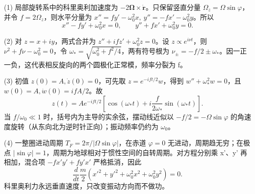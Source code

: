 (1) 局部旋转系中的科里奥利加速度为 \(-2\boldsymbol\Omega\times\dot{\boldsymbol r}\)。只保留竖直分量 \(\Omega_z=\Omega\sin\varphi\)，并令 \(f=2\Omega_z\)，则水平分量为 \(x''=f y'-\omega_0^2x,\ y''=-f x'-\omega_0^2y\)。所以
\[
x''-fy'+\omega_0^2x=0,\qquad
y''+fx'+\omega_0^2y=0.
\]

(2) 对 \(z=x+iy\)，两式合并为 \(z''+ifz'+\omega_0^2z=0\)。设 \(z\propto e^{i\nu t}\)，则 \(\nu^2+f\nu-\omega_0^2=0\)，令 \(\omega_*=\sqrt{\omega_0^2+f^2/4}\)，两有符号根为 \(\nu_\pm=-f/2\pm\omega_*\)。因一正一负，这代表相反旋向的两个圆极化正常模，频率分裂为 f。

(3) 初值 \(z(0)=A,\dot z(0)=0\)，可先取 \(z=e^{-ift/2}w\)，得到 \(w''+\omega_*^2w=0\)，且 \(w(0)=A,\dot w(0)=ifA/2\)。故
\[
z(t)=Ae^{-ift/2}\left[\cos(\omega_*t)+i\frac{f}{2\omega_*}\sin(\omega_*t)\right].
\]
当 \(f/\omega_0\ll1\) 时，括号内为主导的实余弦，摆动线近似以 \(-f/2=-\Omega\sin\varphi\) 的角速度旋转（从东向北为逆时针正向）；振动频率仍约为 \(\omega _{0}\)。

(4) 一整圈进动周期 \(T_F=2\pi/|\Omega\sin\varphi|\)，在赤道 \(\varphi=0\) 无进动，周期趋无穷；在极点 \(|\sin\varphi|=1\)，周期为地球相对于惯性空间的自转周期。对方程分别乘 x'、y' 再相加，混合项 \(-f x'y'+f y'x'\) 严格抵消，因此
\[
\frac d{dt}\frac m2(x'^2+y'^2+\omega_0^2x^2+\omega_0^2y^2)=0.
\]
科里奥利力永远垂直速度，只改变振动方向而不做功。
